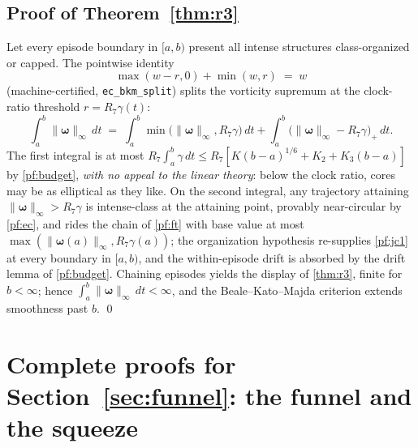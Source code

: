 \documentclass[11pt,letterpaper]{amsart}
\theoremstyle{definition}
\theoremstyle{remark}
\newcommand{\vort}{\boldsymbol{\omega}}
\newcommand{\norm}[1]{\lVert #1 \rVert}
\begin{document}
\subsection{Proof of Theorem~\ref{thm:r3}}\label{pf:r3}
Let every episode boundary in $[a,b)$ present all intense structures class-organized
or capped. The pointwise identity
\[
\max(w-r,0)+\min(w,r)\;=\;w
\]
(machine-certified, \texttt{ec\_bkm\_split}) splits the vorticity supremum at the
clock-ratio threshold $r=R_7\gamma(t)$:
\[
\int_a^b\norm{\vort}_\infty\,dt
\;=\;\int_a^b\min\bigl(\norm{\vort}_\infty,R_7\gamma\bigr)\,dt
+\int_a^b\bigl(\norm{\vort}_\infty-R_7\gamma\bigr)_+\,dt .
\]
The first integral is at most $R_7\int_a^b\gamma\,dt\le
R_7[K(b-a)^{1/6}+K_2+K_3(b-a)]$ by \cref{pf:budget}, \emph{with no appeal to the
linear theory}: below the clock ratio, cores may be as elliptical as they like. On
the second integral, any trajectory attaining $\norm{\vort}_\infty>R_7\gamma$ is
intense-class at the attaining point, provably near-circular by \cref{pf:ec}, and
rides the chain of \cref{pf:ft} with base value at most
$\max(\norm{\vort(a)}_\infty,R_7\gamma(a))$; the organization hypothesis re-supplies
\cref{pf:jc1} at every boundary in $[a,b)$, and the within-episode drift is absorbed
by the drift lemma of \cref{pf:budget}. Chaining episodes yields the display of
\cref{thm:r3}, finite for $b<\infty$; hence $\int_a^b\norm{\vort}_\infty\,dt<\infty$,
and the Beale--Kato--Majda criterion \cite{BealeKatoMajda1984} extends smoothness
past $b$. \qed


\section{Complete proofs for Section~\ref{sec:funnel}: the funnel and the squeeze}\label{pfsec:funnel}
\end{document}
